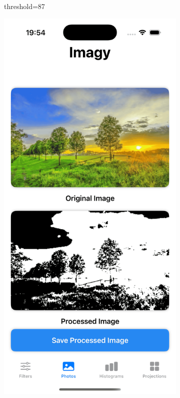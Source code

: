 \documentclass[a4paper]{article}
\begin{document}
\begin{figure}[H]
\begin{subfigure}{0.2\textwidth}
        \caption{threshold=87}
        \label{fig:dog_binary_87}
    \end{subfigure}
    \hfill
    \begin{subfigure}{0.2\textwidth}
        \centering
        \includegraphics[width=\linewidth]{images/trees_binary_128.png}

\end{subfigure}
\end{figure}
\end{document}
